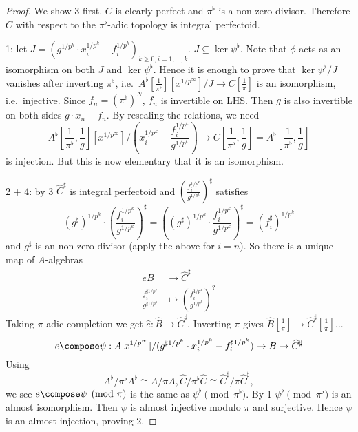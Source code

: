 \documentclass[a4paper]{article}
\newcommand{\tilt}{\flat} %
\begin{document}
\begin{proof}
  We show 3 first. \(C\) is clearly perfect and \(\pi^\tilt\) is a non-zero divisor. Therefore \(\widehat C\) with respect to the \(\pi^\tilt\)-adic topology is integral perfectoid.

  1: let \(J = (g^{1/p^k} \cdot x_i^{1/p^k} - f_i^{1/p^k})_{k \geq 0, i = 1, \dots, k}\). \(J \subseteq \ker \psi^\tilt\). Note that \(\phi\) acts as an isomorphism on both \(J\) and \(\ker \psi^\tilt\). Hence it is enough to prove that \(\ker \psi^\tilt /J\) vanishes after inverting \(\pi^\tilt\), i.e.\ \(A^\tilt[\frac{1}{\pi^\tilt}][x^{1/p^\infty}]/J \to C[\frac{1}{\pi}]\) is an isomorphism, i.e.\ injective. Since \(f_n = (\pi^\tilt)^N\), \(f_n\) is invertible on LHS. Then \(g\) is also invertible on both sides \(g \cdot x_n - f_n\). By rescaling the relations, we need
  \[
    A^\tilt[\frac{1}{\pi^\tilt}, \frac{1}{g}][x^{1/p^\infty}]/(x_i^{1/p^k} - \frac{f_i^{1/p^k}}{g^{1/p^k}}) \to C[\frac{1}{\pi^\tilt}, \frac{1}{g}] = A^\tilt[\frac{1}{\pi^\tilt}, \frac{1}{g}]
  \]
  is injection. But this is now elementary that it is an isomorphism.

  2 + 4: by 3 \(\widehat C^\sharp\) is integral perfectoid and \((\frac{f_i^{1/p^k}}{g^{1/p^k}})^\sharp\) satisfies
  \[
    (g^\sharp)^{1/p^k} \cdot (\frac{f_i^{1/p^k}}{g^{1/p^k}})^\sharp
    = ((g^\sharp)^{1/p^k} \cdot \frac{f_i^{1/p^k}}{g^{1/p^k}})^\sharp
    = (f_i^\sharp)^{1/p^k}
  \]
  and \(g^\sharp\) is an non-zero divisor (apply the above for \(i = n\)). So there is a unique map of \(A\)-algebras
  \begin{align*}
    eB &\to \widehat C^\sharp \\
    \frac{f_i^{\sharp 1/p^k}}{g^{\sharp 1/p^k}} &\mapsto (\frac{f_i^{1/p^k}}{g^{1/p^k}})^?
  \end{align*}
  Taking \(\pi\)-adic completion we get \(\hat e: \widehat B \to \widehat C^\sharp\). Inverting \(\pi\) gives \(\widehat B[\frac{1}{\pi}] \to \widehat C^\sharp[\frac{1}{\pi}]\)...
  \[
    e \compose \psi: A[x^{1/p^\infty}]/(g^{\sharp 1/p^k} \cdot x_i^{1/p^k} - f_i^{\sharp 1/p^k}) \to B \to \widehat C^\sharp
  \]
  Using
  \[
    A^\tilt/\pi^\tilt A^\tilt \cong A/\pi A, \widehat C/\pi^\tilt \widehat C \cong \widehat C^\sharp/\pi \widehat C^\sharp,
  \]
  we see \(e \compose \psi \pmod \pi\) is the same as \(\psi^\tilt \pmod{\pi^\tilt}\). By 1 \(\psi^\tilt \pmod{\pi^\tilt}\) is an almost isomorphism. Then \(\psi\) is almost injective modulo \(\pi\) and surjective. Hence \(\psi\) is an almost injection, proving 2.


\end{proof}
\end{document}
